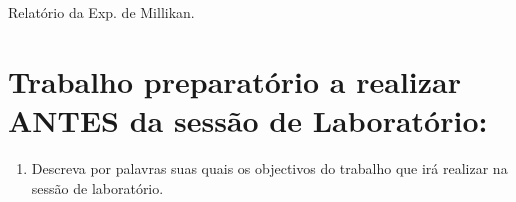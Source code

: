 \documentclass[a4paper,12pt]{article}  %
\author{Prof. Bernardo B. Carvalho}
\date{ Outubro 2014}
\newcommand{\HRule}{\rule{\linewidth}{0.5mm}}
\begin{document}
 



{  \sf  Relatório da Exp. de Millikan.} %



\section{\sf Trabalho preparatório a realizar  ANTES da sessão de Laboratório:}
\begin{enumerate}
\item Descreva por palavras suas quais os objectivos do trabalho que irá realizar na sessão de laboratório.

\end{enumerate}
\end{document}
